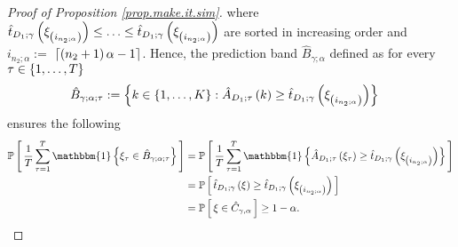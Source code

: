 \documentclass[11pt]{article}
\begin{document}
\begin{proof}[Proof of Proposition \ref{prop.make.it.sim}]
where $\hat{t}_{D_1; \gamma} \left( \xi_{\left( i_{n_2; \alpha} \right)} \right) \leq \ldots \leq \hat{t}_{D_1; \gamma} \left( \xi_{\left( i_{n_2; \alpha} \right)} \right)$
are sorted in increasing order and $i_{n_2; \alpha} :=$ $\left\lceil \left( n_2 + 1 \right)\alpha - 1 \right\rceil$.
%
%
%
Hence, the prediction band $\hat{B}_{\gamma; \alpha}$ defined as for every $\tau \in \left\{ 1, \ldots, T \right\}$
\begin{align*}
    \hat{B}_{\gamma; \alpha; \tau}
    &
    := \left\{ 
        k \in \left\{ 1, \ldots, K \right\} : \hat{A}_{D_1; \tau} \left( k \right) \geq \hat{t}_{D_1; \gamma} \left( \xi_{\left( i_{n_2; \alpha} \right)} \right)
     \right\}
\end{align*}
ensures the following
%
%
%
\begin{align*}
    \mathbb{P}
    \croch{
        \frac{1}{T}
        \sum_{\tau=1}^{T}
        \mathbbm{1}
        \brac{
            \xi_{\tau} \in \hat{B}_{\gamma; \alpha; \tau}
        }
    }
    &
    =
    \mathbb{P}
    \croch{
        \frac{1}{T}
        \sum_{\tau=1}^{T}
        \mathbbm{1}
        \brac{
            \hat{A}_{D_1; \tau}\paren{\xi_{\tau}} \geq \hat{t}_{D_1; \gamma} \paren{\xi_{\paren{i_{n_2; \alpha}}}}
        }
    }
    \\
    &
    =
    \mathbb{P}
    \croch{
        \hat{t}_{D_1; \gamma} \paren{\xi} \geq \hat{t}_{D_1; \gamma} \paren{\xi_{\paren{i_{n_2; \alpha}}}}
    }
    \\
    &
    =
    \mathbb{P}
    \croch{
        \xi \in \hat{C}_{\gamma, \alpha}
    } \geq 1 - \alpha.
\end{align*}
\end{proof}

%
%
%
\end{document}
